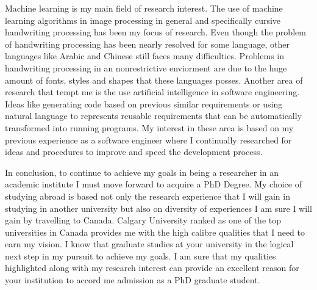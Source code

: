 \documentclass[a4paper,12pt]{article}%
\begin{document}
 
 Machine learning is my main field of research interest. The use of machine learning algorithms in image processing in general and specifically cursive handwriting processing has been my focus of research. Even though the problem of handwriting processing has been nearly resolved for some language, other languages like Arabic and Chinese still faces many difficulties. Problems in handwriting processing in an nonrestrictive enviorment are due to the huge amount of fonts, styles and shapes that these languages posses. Another area of research that tempt me is the use artificial intelligence in software engineering. Ideas like  generating code based on previous similar requirements or using natural language to represents reusable requirements that can be automatically transformed into running programs. My interest in these area is based on my previous experience as a software engineer where I continually researched for ideas and procedures to improve and speed the development process.        
 
 
  In conclusion, to continue to achieve my goals in being a researcher in an academic institute I must move forward to acquire a PhD Degree. My choice of studying abroad is based not only the research experience that I will gain in  studying in another university but also on diversity of experiences I am sure I will gain by travelling to Canada. Calgary University ranked as one of the top universities in Canada provides me with the high calibre qualities that I need to earn my vision. I know that graduate studies at your university in the logical next step in my pursuit to achieve my goals. I am sure that my qualities highlighted along with my research interest can provide an excellent reason for your institution to accord me admission as  a PhD graduate student.


\end{document}
